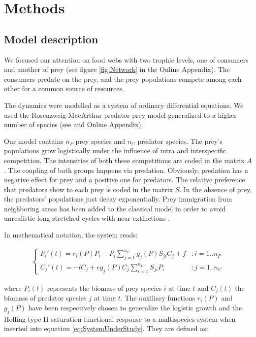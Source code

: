 \section{Methods}
\label{sec:Methods}

\subsection{Model description}
\label{subsec:Model}

We focused our attention on food webs with two trophic levels, one of consumers and another of prey (see figure \ref{fig:Network} in the Online Appendix). The consumers predate on the prey, and the prey populations compete among each other for a common source of resources. 

The dynamics were modelled as a system of ordinary differential equations. We used the Rosenzweig-MacArthur predator-prey model \cite{Rosenzweig1963} generalized to a higher number of species (see \cite{Scheffer2004} and Online Appendix). 

Our model contains $n_P$ prey species and $n_C$ predator species. The prey's populations grow logistically under the influence of intra and interspecific competition. The intensities of both these competitions are coded in the matrix $A$. The coupling of both groups happens via predation. Obviously, predation has a negative effect for prey and a positive one for predators. The relative preference that predators show to each prey is coded in the matrix $S$. In the absence of prey, the predators' populations just decay exponentially. Prey immigration from neighboring areas has been added to the classical model in order to avoid unrealistic long-stretched cycles with near extinctions \cite{Scheffer2004}.

In mathematical notation, the system reads:

\begin{eqnarray}
\label{eq:SystemUnderStudy}
	\begin{cases} 
	P_i'(t) =  r_i(P) P_i  - P_i \sum_{j = 1}^{n_C} g_j(P) S_{ji} C_j + f & : i = 1..n_P
	\\
	C_j'(t) = - l C_j +  e g_j(P) C_j \sum_{i = 1}^{n_P} S_{ji} P_i & : j = 1..n_C
	\end{cases}
\end{eqnarray}

where $P_i(t)$ represents the biomass of prey species $i$ at time $t$ and $C_j(t)$ the biomass of predator species $j$ at time $t$. The auxiliary functions $r_i(P)$ and $g_j(P)$ have been respectively chosen to generalize the logistic growth and the Holling type II saturation functional response \cite{Edelstein-Keshet} to a multispecies system when inserted into equation \ref{eq:SystemUnderStudy}. They are defined as:

